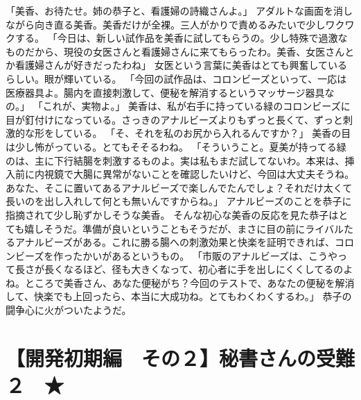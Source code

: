 「美香、お待たせ。姉の恭子と、看護婦の詩織さんよ。」
アダルトな画面を消しながら向き直る美香。美香だけが全裸。三人がかりで責めるみたいで少しワクワクする。
「今日は、新しい試作品を美香に試してもらうの。少し特殊で過激なものだから、現役の女医さんと看護婦さんに来てもらったわ。美香、女医さんとか看護婦さんが好きだったわね」
女医という言葉に美香はとても興奮しているらしい。眼が輝いている。
「今回の試作品は、コロンビーズといって、一応は医療器具よ。腸内を直接刺激して、便秘を解消するというマッサージ器具なの。」
「これが、実物よ。」
美香は、私が右手に持っている緑のコロンビーズに目が釘付けになっている。さっきのアナルビーズよりもずっと長くて、ずっと刺激的な形をしている。
「そ、それを私のお尻から入れるんですか？」
美香の目は少し怖がっている。とてもそそるわね。
「そういうこと。夏美が持ってる緑のは、主に下行結腸を刺激するものよ。実は私もまだ試してないわ。本来は、挿入前に内視鏡で大腸に異常がないことを確認したいけど、今回は大丈夫そうね。あなた、そこに置いてあるアナルビーズで楽しんでたんでしょ？それだけ太くて長いのを出し入れして何とも無いんですからね。」
アナルビーズのことを恭子に指摘されて少し恥ずかしそうな美香。
そんな初心な美香の反応を見た恭子はとても嬉しそうだ。準備が良いということもそうだが、まさに目の前にライバルたるアナルビーズがある。これに勝る腸への刺激効果と快楽を証明できれば、コロンビーズを作ったかいがあるというもの。
「市販のアナルビーズは、こうやって長さが長くなるほど、径も大きくなって、初心者に手を出しにくくしてるのよね。ところで美香さん、あなた便秘がち？今回のテストで、あなたの便秘を解消して、快楽でも上回ったら、本当に大成功ね。とてもわくわくするわ。」
恭子の闘争心に火がついたようだ。


\section{【開発初期編　その２】秘書さんの受難２　★}

